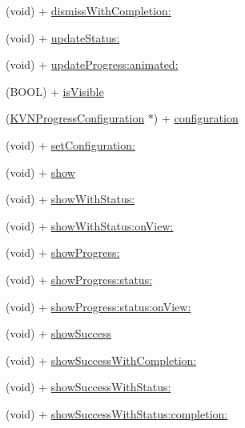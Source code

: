\begin{DoxyCompactItemize}
\item 
(void) + \mbox{\hyperlink{interface_k_v_n_progress_a7ec9c844ebb26d0f9cdff6ef3d737d28}{dismiss\+With\+Completion\+:}}
\item 
(void) + \mbox{\hyperlink{interface_k_v_n_progress_ab50b37330761d25ce8b261290537da1a}{update\+Status\+:}}
\item 
(void) + \mbox{\hyperlink{interface_k_v_n_progress_a70c537364b9ea751af24178448335b98}{update\+Progress\+:animated\+:}}
\item 
(B\+O\+OL) + \mbox{\hyperlink{interface_k_v_n_progress_a28dddb521ec06e907b8cc436b34e71cb}{is\+Visible}}
\item 
(\mbox{\hyperlink{interface_k_v_n_progress_configuration}{K\+V\+N\+Progress\+Configuration}} $\ast$) + \mbox{\hyperlink{interface_k_v_n_progress_aaba9484a867f6da9cb051da337161d15}{configuration}}
\item 
(void) + \mbox{\hyperlink{interface_k_v_n_progress_ab00ed30bcc9ef7e6517f27554d570bf9}{set\+Configuration\+:}}
\item 
(void) + \mbox{\hyperlink{interface_k_v_n_progress_ad27933d0b2a65108404a514029689fb8}{show}}
\item 
(void) + \mbox{\hyperlink{interface_k_v_n_progress_af86acbff98a05f0ee39e746628b02022}{show\+With\+Status\+:}}
\item 
(void) + \mbox{\hyperlink{interface_k_v_n_progress_ae317161c16121fa1b3dcdb9c1e9f7a8f}{show\+With\+Status\+:on\+View\+:}}
\item 
(void) + \mbox{\hyperlink{interface_k_v_n_progress_abc53102e1cb121a8b38c3337ce372517}{show\+Progress\+:}}
\item 
(void) + \mbox{\hyperlink{interface_k_v_n_progress_a2c58c4d42f018ef3efbb163f6390004e}{show\+Progress\+:status\+:}}
\item 
(void) + \mbox{\hyperlink{interface_k_v_n_progress_a57a53b4b0ddb93f604d24c50ec9c0602}{show\+Progress\+:status\+:on\+View\+:}}
\item 
(void) + \mbox{\hyperlink{interface_k_v_n_progress_a3b92c0b7eeebe3537ba37d7f56c5b2bb}{show\+Success}}
\item 
(void) + \mbox{\hyperlink{interface_k_v_n_progress_aa5757d5457364be1b1a03224c934ff32}{show\+Success\+With\+Completion\+:}}
\item 
(void) + \mbox{\hyperlink{interface_k_v_n_progress_ae9b8b57302f6a4456658e758784790bf}{show\+Success\+With\+Status\+:}}
\item 
(void) + \mbox{\hyperlink{interface_k_v_n_progress_aa4d2366ad5664f42a3c9214f97e4d373}{show\+Success\+With\+Status\+:completion\+:}}

\end{DoxyCompactItemize}
